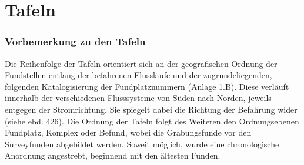 \chapter*{Tafeln}\label{sec:Tafeln}

\subsection*{Vorbemerkung zu den Tafeln}

Die Reihenfolge der Tafeln orientiert sich an der geografischen Ordnung der Fundstellen entlang der befahrenen Flussläufe und der zugrundeliegenden, \textcite{Wotzka.1995} folgenden Katalogisierung der Fundplatznummern (Anlage 1.B). Diese verläuft innerhalb der verschiedenen Flusssysteme von Süden nach Norden, jeweils entgegen der Stromrichtung. Sie spiegelt dabei die Richtung der Befahrung wider (siehe ebd. 426). Die Ordnung der Tafeln folgt des Weiteren den Ordnungsebenen Fundplatz, Komplex oder Befund, wobei die Grabungsfunde vor den Surveyfunden abgebildet werden. Soweit möglich, wurde eine chronologische Anordnung angestrebt,  beginnend mit den ältesten Funden. 

\begin{scriptsize}

\end{scriptsize}

